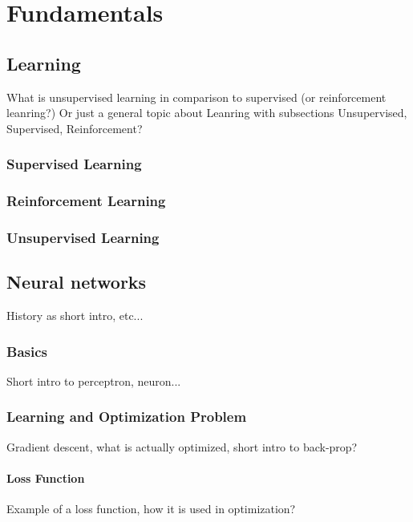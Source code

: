 
\chapter{Fundamentals} \label{chapter:fundamentals}

\section{Learning}

What is unsupervised learning in comparison to supervised (or reinforcement leanring?)
Or just a general topic about Leanring with subsections Unsupervised, Supervised, Reinforcement?

\subsection{Supervised Learning}
\subsection{Reinforcement Learning}
\subsection{Unsupervised Learning}


\section{Neural networks}

History as short intro, etc...

\subsection{Basics}

Short intro to perceptron, neuron...

\subsection{Learning and Optimization Problem}

Gradient descent, what is actually optimized, short intro to back-prop?

\subsubsection{Loss Function}

Example of a loss function, how it is used in optimization?


